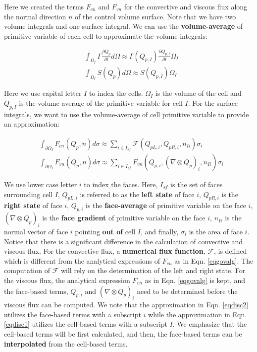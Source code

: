 \documentclass[12pt, letterpaper]{report}
\begin{document}
Here we created the terms $F_{cn}$ and $F_{vn}$ for the convective and viscous flux along the normal
direction $n$ of the control volume surface. Note that we have two volume integrals and one surface
integral. We can use the {\bf volume-average} of primitive variable of each cell to approximate the
volume integrals:

\begin{subequations}\label{eqdisc1}
   \begin{align}
      &\int_{\Omega_I} \Gamma \frac{\partial Q_p}{\partial t} d\Omega \approx \Gamma(Q_{p,I}) \frac{\partial
      Q_{p,I}}{\partial t} \Omega_I \\
      &\int_{\Omega_I} S(Q_p) d\Omega \approx S(Q_{p,I}) \Omega_I
   \end{align}
\end{subequations}

Here we use capital letter $I$ to index the cells. $\Omega_I$ is the volume of the cell and
$Q_{p,I}$ is the volume-average of the primitive variable for cell $I$. For the surface integrals,
we want to use the volume-average of cell primitive variable to provide an approximation:

\begin{subequations}\label{eqdisc2}
   \begin{align}
      &\int_{\partial\Omega_I} F_{cn}(Q_p, n) d\sigma \approx \sum_{i \in I_{sf}} \mathcal{F}(Q_{pL,i},
      Q_{pR,i}, n_{Ii}) \sigma_i \\
      &\int_{\partial\Omega_I} F_{vn}(Q_p, n) d\sigma \approx \sum_{i \in I_{sf}} F_{vn}(Q_{p,i},
      (\nabla \mathop{\otimes} Q_p)_i, n_{Ii}) \sigma_i
   \end{align}
\end{subequations}

We use lower case letter $i$ to index the faces. Here, $I_{sf}$ is the set of faces surrounding cell
$I$, $Q_{pL,i}$ is referred to as the {\bf left state} of face $i$, $Q_{pR,i}$ is the {\bf right
state} of face $i$, $Q_{p,i}$ is the {\bf face-average} of primitive variable on the face $i$,
$(\nabla \mathop{\otimes} Q_p)_i$ is the {\bf face gradient} of primitive variable on the face $i$,
$n_{Ii}$ is the normal vector of face $i$ pointing {\bf out of} cell $I$, and finally, $\sigma_i$ is
the area of face $i$. Notice that there is a significant difference in the calculation of convective
and viscous flux. For the convective flux, a {\bf numerical flux function}, $\mathcal{F}$, is
defined which is different from the analytical expressions of $F_{cn}$ as in Eqn. \ref{eqgovalg}.
The computation of $\mathcal{F}$ will rely on the determination of the left and right state. For the
viscous flux, the analytical expression $F_{vn}$ as in Eqn. \ref{eqgovalg} is kept, and the
face-based terms, $Q_{p,i}$ and $(\nabla \mathop{\otimes} Q_p)_i$ need to be determined before the
viscous flux can be computed. We note that the approximation in Eqn. \ref{eqdisc2} utilizes the
face-based terms with a subscript $i$ while the approximation in Eqn. \ref{eqdisc1} utilizes the
cell-based terms with a subscript $I$. We emphasize that the cell-based terms will be first
calculated, and then, the face-based terms can be {\bf interpolated} from the cell-based terms.
\paraspace
\end{document}
